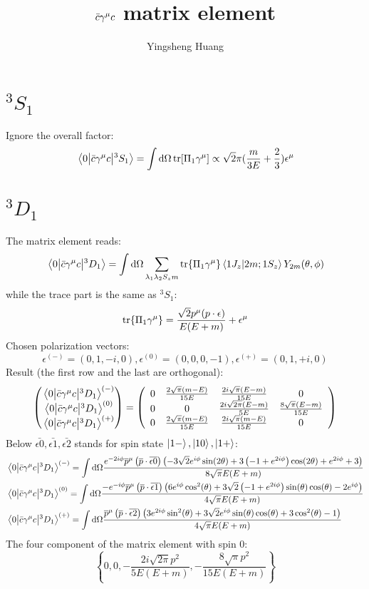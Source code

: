 \documentclass{article}
\title{$\bar c\gm c$ matrix element}
\author{Yingsheng Huang}
\newcommand{\gm}{\gamma^{\mu}}
\newcommand{\la}{\lambda}
\begin{document}
\maketitle
\section{$^3S_1$}
Ignore the overall factor:
$$\mel{0}{\bar c\gm c}{^3S_1}=\int\dd\Omega\tr[\Pi_1\gm]\propto\sqrt{2}\pi(\frac{m}{3 E}+\frac{2}{3})\epsilon^{\mu}$$
\section{$^3D_1$}
The matrix element reads:
$$\mel{0}{\bar c\gm c}{^3D_1}=\int\dd\Omega\sum_{\la_1\la_2 S_zm}\tr{\Pi_1\gm}\braket{1J_z}{2m;1S_z}Y_{2m}(\theta,\phi)$$
while the trace part is the same as $^3S_1$:
$$\tr{\Pi_1\gm}=\frac{\sqrt{2}p^{\mu}(p\cdot\epsilon)}{E(E+m)}+\epsilon^{\mu}$$
Chosen polarization vectors: 
$$\epsilon^{(-)}=(0,1,-i,0),\epsilon^{(0)}=(0,0,0,-1),\epsilon^{(+)}=(0,1,+i,0)$$
Result (the first row and the last are orthogonal):  
$$\pmqty{\mel{0}{\bar c\gm c}{^3D_1}^{(-)}\\\mel{0}{\bar c\gm c}{^3D_1}^{(0)}\\\mel{0}{\bar c\gm c}{^3D_1}^{(+)}}=\left(
\begin{array}{cccc}
 0 & \frac{2 \sqrt{\pi } (m-E)}{15 E} & \frac{2 i \sqrt{\pi } (E-m)}{15 E} & 0 \\
 0 & 0 & \frac{2 i \sqrt{2 \pi } (E-m)}{5 E} & \frac{8 \sqrt{\pi } (E-m)}{15 E} \\
 0 & \frac{2 \sqrt{\pi } (m-E)}{15 E} & \frac{2 i \sqrt{\pi } (m-E)}{15 E} & 0 \\
\end{array}
\right)$$
Below $\bar{\epsilon0},\bar{\epsilon1},\bar{\epsilon2}$ stands for spin state $\ket{1-},\ket{10},\ket{1+}$:
\begin{align*}
&\mel{0}{\bar c\gm c}{^3D_1}^{(-)}=\int\dd\Omega\frac{e^{-2 i \phi } \overline{p}^{\mu } \left(\overline{p}\cdot
   \overline{\text{$\epsilon $0}}\right) \left(-3 \sqrt{2} e^{i \phi } \sin (2 \theta
   )+3 \left(-1+e^{2 i \phi }\right) \cos (2 \theta )+e^{2 i \phi }+3\right)}{8
   \sqrt{\pi } E (E+m)}\\
&\mel{0}{\bar c\gm c}{^3D_1}^{(0)}=\int\dd\Omega \frac{-e^{-i \phi } \overline{p}^{\mu } \left(\overline{p}\cdot
   \overline{\text{$\epsilon $1}}\right) \left(6 e^{i \phi } \cos ^2(\theta )+3
   \sqrt{2} \left(-1+e^{2 i \phi }\right) \sin (\theta ) \cos (\theta )-2 e^{i \phi
   }\right)}{4 \sqrt{\pi } E (E+m)}\\
&\mel{0}{\bar c\gm c}{^3D_1}^{(+)}=\int\dd\Omega\frac{\overline{p}^{\mu } \left(\overline{p}\cdot \overline{\text{$\epsilon
   $2}}\right) \left(3 e^{2 i \phi } \sin ^2(\theta )+3 \sqrt{2} e^{i \phi } \sin
   (\theta ) \cos (\theta )+3 \cos ^2(\theta )-1\right)}{4 \sqrt{\pi } E (E+m)}
\end{align*}
The four component of the matrix element with spin 0:
   $$\left\{0,0,-\frac{2 i \sqrt{2 \pi } p^2}{5 E (E+m)},-\frac{8 \sqrt{\pi } p^2}{15 E (E+m)}\right\}$$
\end{document}

